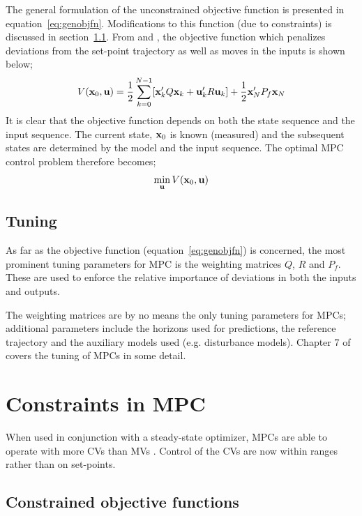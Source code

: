 The general formulation of the unconstrained objective function is presented in equation~\ref{eq:genobjfn}. 
Modifications to this function (due to constraints) is discussed in section~\ref{sec:conobjfn}. 
From \citet[17]{rawlings} and \citet[41]{maciejowskimpc}, the objective function which penalizes deviations from the set-point trajectory as well as moves in the inputs is shown below;
\begin{equation}
  \label{eq:genobjfn}
  V({\bf {x}}_0,{\bf {u}})=\frac{1}{2}\sum^{N-1}_{k=0}[{\bf {x}}_k'Q{\bf {x}}_k + {\bf {u}}_k'R{\bf {u}}_k]
  + \frac{1}{2}{\bf {x}}_N'P_f{\bf {x}}_N
\end{equation}
It is clear that the objective function depends on both the state sequence and the input sequence. 
The current state, ${\bf {x}}_0$ is known (measured) and the subsequent states are determined by the model and the input sequence. 
The optimal MPC control problem therefore becomes;
\begin{equation}
  \label{eq:opctrlprob}
  \min_{{\bf {u}}} V({\bf {x}}_0,{\bf u})
\end{equation}

\subsection{Tuning}
As far as the objective function (equation~\ref{eq:genobjfn}) is concerned, the most prominent tuning parameters for MPC is the weighting matrices $Q$, $R$ and $P_f$. 
These are used to enforce the relative importance of deviations in both the inputs and outputs.

The weighting matrices are by no means the only tuning parameters for MPCs; additional parameters include the horizons used for predictions, the reference trajectory and the auxiliary models used (e.g. disturbance models). 
Chapter 7 of \citet{maciejowskimpc} covers the tuning of MPCs in some detail.

\section{Constraints in MPC}
When used in conjunction with a steady-state optimizer, MPCs are able to operate with more CVs than MVs \citet{vinsonphd}. 
Control of the CVs are now within ranges rather than on set-points.
\subsection{Constrained objective functions}\label{sec:conobjfn}
